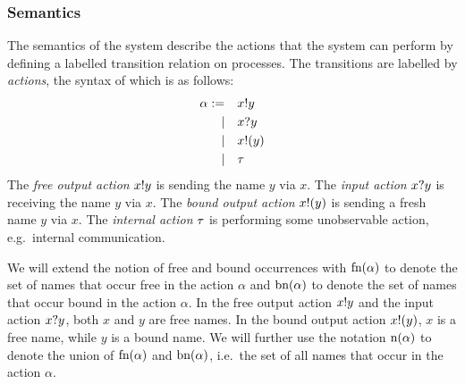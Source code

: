 

\subsubsection{Semantics}
The semantics of the system describe the actions that the system can perform by defining a labelled transition relation on processes.
The transitions are labelled by \emph{actions}, the syntax of which is as follows:
\begin{align*}
  \alpha := &&& x ! y \\
  |&&& x ? y \\
  |&&& x ! (y) \\
  |&&& \tau
\end{align*}
The \emph{free output action} \( x ! y \) is sending the name \( y \) via \( x \).
The \emph{input action} \( x ? y \) is receiving the name \( y \) via \( x \).
The \emph{bound output action} \( x ! (y) \) is sending a fresh name \( y \) via \( x \).
The \emph{internal action} \( \tau \) is performing some unobservable action, e.g.\ internal communication.

We will extend the notion of free and bound occurrences with 
\( \textrm{fn}(\alpha) \) to denote the set of names that occur free in
the action \( \alpha \) and  \( \textrm{bn}(\alpha) \) to
denote the set of names that occur bound in the action \( \alpha \).
In the free output action \( x ! y \) and the input action
\( x ? y \), both \( x \) and \( y \) are free names.  In the
bound output action \( x ! (y) \), \( x \) is a free name, while
\( y \) is a bound name.  We will further use the notation
\( \textrm{n}(\alpha) \) to denote the union of \( \textrm{fn}(\alpha) \)
and \( \textrm{bn}(\alpha) \), i.e.\ the set of all names that occur
in the action \( \alpha \).

